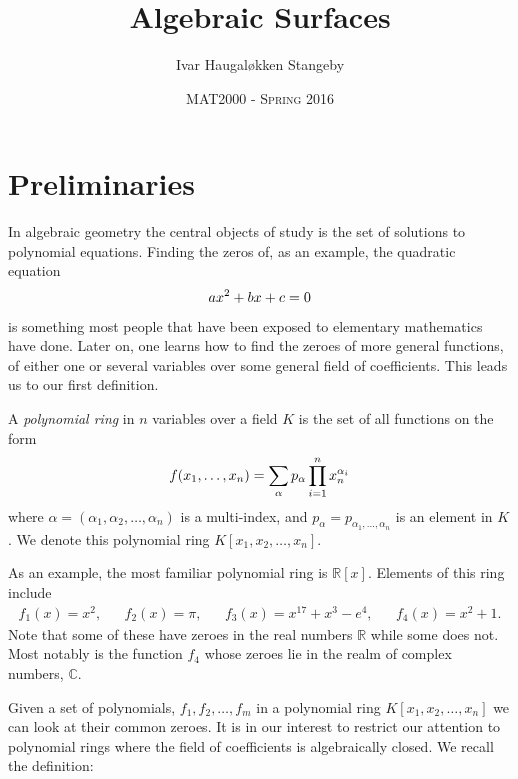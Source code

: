 \documentclass{article}
\title{Algebraic Surfaces}
\author{Ivar Haugal{\o}kken Stangeby}
\date{\textsc{MAT2000 - Spring 2016}}
\newcommand{\R}{\ensuremath{\mathbb{R}}}
\newcommand{\C}{\ensuremath{\mathbb{C}}}
\begin{document}
    \tableofcontents

    \section{Preliminaries}
    \label{sec:preliminaries}
    
    In algebraic geometry the central objects of study is the set of solutions
    to polynomial equations. Finding the zeros of, as an example, the quadratic
    equation
    \begin{equation}
        \notag
        ax^2 + bx + c = 0
    \end{equation}
    is something most people that have been exposed to elementary mathematics
    have done. Later on, one learns how to find the zeroes of more general
    functions, of either one or several variables over some general field of
    coefficients. This leads us to our first definition.

    \begin{definition}
        A \emph{polynomial ring} in $n$ variables over a field $K$ is the set
        of all functions on the form
        \begin{equation}
            \notag
            f(x_1, \ldots, x_n) = \sum^{}_{\alpha} p_{\alpha}\prod_{i=1}^{n} x_n^{\alpha_i}
        \end{equation}
        where $\alpha = (\alpha_1, \alpha_2, \ldots, \alpha_n)$ is a
        multi-index, and $p_\alpha = p_{\alpha_1,\ldots,\alpha_n}$ is an
        element in $K$.  We denote this polynomial ring $K[x_1, x_2, \ldots,
        x_n]$.
    \end{definition} 
    As an example, the most familiar polynomial ring is $\R[x]$. Elements of
    this ring include
    \begin{align*}
        f_1(x) = x^2, && f_2(x) = \pi, && f_3(x) = x^{17} + x^{3} - e^{4}, && f_4(x) = x^2 + 1.
    \end{align*} 
    Note that some of these have zeroes in the real numbers $\R$ while some
    does not. Most notably is the function $f_4$ whose zeroes lie in the realm
    of complex numbers, $\C$.

    Given a set of polynomials, $f_1, f_2, \ldots, f_m$ in a polynomial ring
    $K[x_1, x_2, \ldots, x_n]$ we can look at their common zeroes. It is in our
    interest to restrict our attention to polynomial rings where the field of
    coefficients is algebraically closed. We recall the definition:
\end{document}
